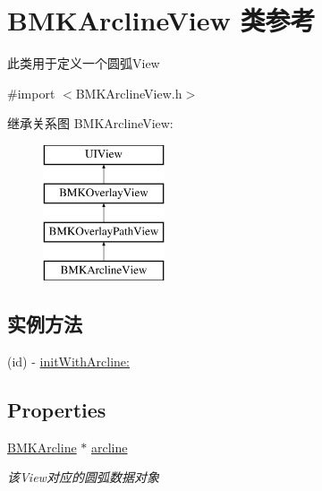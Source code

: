 \hypertarget{interface_b_m_k_arcline_view}{\section{B\-M\-K\-Arcline\-View 类参考}
\label{interface_b_m_k_arcline_view}
}


此类用于定义一个圆弧\-View  




{\ttfamily \#import $<$B\-M\-K\-Arcline\-View.\-h$>$}

继承关系图 B\-M\-K\-Arcline\-View\-:\begin{figure}[H]
\begin{center}
\leavevmode
\includegraphics[height=4.000000cm]{interface_b_m_k_arcline_view}
\end{center}
\end{figure}
\subsection*{实例方法}
\begin{DoxyCompactItemize}
\item 
(id) -\/ \hyperlink{interface_b_m_k_arcline_view_ab5f05370f8d16895a04be3fb4168210a}{init\-With\-Arcline\-:}
\end{DoxyCompactItemize}
\subsection*{Properties}
\begin{DoxyCompactItemize}
\item 
\hypertarget{interface_b_m_k_arcline_view_a824cf05f5bd4ff3790e78095ee72e6c2}{\hyperlink{interface_b_m_k_arcline}{B\-M\-K\-Arcline} $\ast$ \hyperlink{interface_b_m_k_arcline_view_a824cf05f5bd4ff3790e78095ee72e6c2}{arcline}}\label{interface_b_m_k_arcline_view_a824cf05f5bd4ff3790e78095ee72e6c2}

\begin{DoxyCompactList}\small\item\em 该\-View对应的圆弧数据对象 \end{DoxyCompactList}\end{DoxyCompactItemize}
